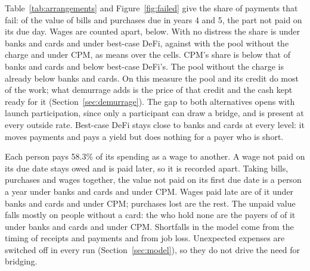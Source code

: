 Table~\ref{tab:arrangements} and Figure~\ref{fig:failed} give the share of payments that fail: of the value of
bills and purchases due in years 4 and 5, the part not paid on its due day. Wages are counted
apart, below. With no distress the share is \FailBanksMean{} under banks and cards and
\FailDefiMean{} under best-case DeFi, against \FailPoolMean{} with the pool without the charge and \FailCpmMean{}
under CPM, as means over the \CellsNoDistress{} cells. CPM's share is \FailCutBanks{} below that of banks and
cards and \FailCutDefi{} below best-case DeFi's. The pool without the charge is already \FailCutPoolBanks{} below
banks and cards. On this measure the pool and its credit do most of the work; what demurrage adds is the
price of that credit and the cash kept ready for it (Section~\ref{sec:demurrage}). The gap to both
alternatives opens with launch participation, since only a participant can draw a bridge, and is present at
every outside rate. Best-case DeFi stays close to banks and cards at every level: it moves payments and pays a
yield but does nothing for a payer who is short.

Each person pays 58.3\% of its spending as a wage to another. A wage not paid on
its due date stays owed and is paid later, so it is recorded apart. Taking bills, purchases
and wages together, the value not paid on its first due date is \FailedValueBanks{} a person a year under banks
and cards and \FailedValueCpm{} under CPM. Wages paid late are \FailedWageShareBanks{} of it under banks and
cards and \FailedWageShareCpm{} under CPM; purchases lost are the rest. The unpaid value falls mostly on people without a
card: the \NoCardPeople{} who hold none are the payers of \NoCardFailedShareBanks{} of it
under banks and cards and \NoCardFailedShareCpm{} under CPM. Shortfalls in the model come from the timing of receipts and
payments and from job loss. Unexpected expenses are switched off in every run (Section~\ref{sec:model}), so they do
not drive the need for bridging.

\begin{table}[htbp]\centering\small
\resizebox{\linewidth}{!}{}
\caption{Payments that fail: the value of bills and purchases not paid on their due day, as a share of the value
due in years 4 and 5 (wages counted apart), with no distress and at 2 points of distress, by
arrangement: the mean and the range over cells of the seed means. The last column is purchases completed.}
\label{tab:arrangements}
\end{table}

